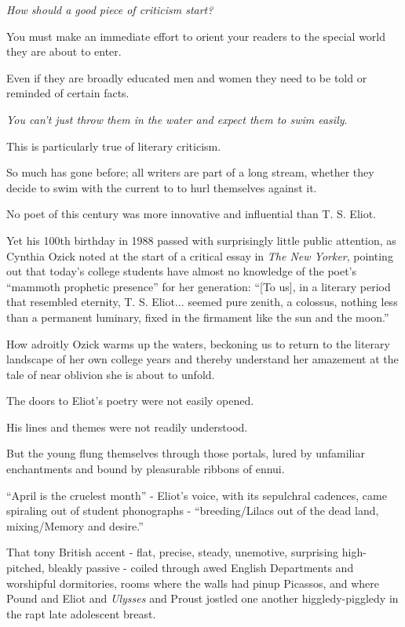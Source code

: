 \documentclass{book}
\numberwithin{equation}{section}
\begin{document}
%
\textit{How should a good piece of criticism start?}

You must make an immediate effort to orient your readers to the special world they are about to enter.

Even if they are broadly educated men and women they need to be told or reminded of certain facts.

\textit{You can't just throw them in the water and expect them to swim easily}.


%
This is particularly true of literary criticism.

So much has gone before; all writers are part of a long stream, whether they decide to swim with the current to to hurl themselves against it.

No poet of this century was more innovative and influential than T. S. Eliot.

Yet his 100th birthday in 1988 passed with surprisingly little public attention, as Cynthia Ozick noted at the start of a critical essay in \textit{The New Yorker}, pointing out that today's college students have almost no knowledge of the poet's ``mammoth prophetic presence'' for her generation: ``[To us], in a literary period that resembled eternity, T. S. Eliot$\ldots$ seemed pure zenith, a colossus, nothing less than a permanent luminary, fixed in the firmament like the sun and the moon.''

%
How adroitly Ozick warms up the waters, beckoning us to return to the literary landscape of her own college years and thereby understand her amazement at the tale of near oblivion she is about to unfold.

%
The doors to Eliot's poetry were not easily opened.

His lines and themes were not readily understood.

But the young flung themselves through those portals, lured by unfamiliar enchantments and bound by pleasurable ribbons of ennui.

``April is the cruelest month'' - Eliot's voice, with its sepulchral cadences, came spiraling out of student phonographs - ``breeding/Lilacs out of the dead land, mixing/Memory and desire.''

That tony British accent - flat, precise, steady, unemotive, surprising high-pitched, bleakly passive - coiled through awed English Departments and worshipful dormitories, rooms where the walls had pinup Picassos, and where Pound and Eliot and \textit{Ulysses} and Proust jostled one another higgledy-piggledy in the rapt late adolescent breast.
\end{document}
